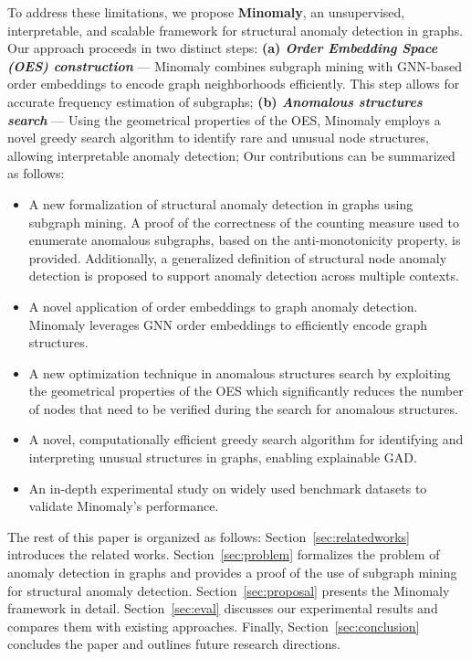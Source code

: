 \documentclass[pdflatex,sn-mathphys-num]{sn-jnl}%
\theoremstyle{thmstyleone}%
\theoremstyle{thmstyletwo}%
\theoremstyle{thmstylethree}%
\begin{document}
To address these limitations, we propose \textbf{Minomaly}, an unsupervised, interpretable, and scalable framework for structural anomaly detection in graphs. Our approach proceeds in two distinct steps: \textbf{(a) \textit{Order Embedding Space (OES) construction}}  --- Minomaly combines subgraph mining with GNN-based order embeddings to encode graph neighborhoods efficiently. This step allows for accurate frequency estimation of subgraphs; \textbf{(b) \textit{Anomalous structures search}}  --- Using the geometrical properties of the OES, Minomaly employs a novel greedy search algorithm to identify rare and unusual node structures, allowing interpretable anomaly detection;
Our contributions can be summarized as follows:
\begin{itemize}
    \item A new formalization of structural anomaly detection in graphs using subgraph mining. A proof of the correctness of the counting measure used to enumerate anomalous subgraphs, based on the anti-monotonicity property, is provided. Additionally, a generalized definition of structural node anomaly detection is proposed to support anomaly detection across multiple contexts.
    \item A novel application of order embeddings to graph anomaly detection. Minomaly leverages GNN order embeddings to efficiently encode graph structures.
    \item A new optimization technique in anomalous structures search by exploiting the geometrical properties of the OES which significantly reduces the number of nodes that need to be verified during the search for anomalous structures.
    \item A novel, computationally efficient greedy search algorithm for identifying and interpreting unusual structures in graphs, enabling explainable GAD.
    \item An in-depth experimental study on widely used benchmark datasets to validate Minomaly's performance. 
\end{itemize}

The rest of this paper is organized as follows:  
{Section~\ref{sec:relatedworks}} introduces the  related works. {Section~\ref{sec:problem}} formalizes the problem of anomaly detection in graphs and provides a proof of the use of subgraph mining for structural anomaly detection.  
{Section~\ref{sec:proposal}} presents the Minomaly framework in detail.  
{Section~\ref{sec:eval}} discusses our experimental results and compares them with existing approaches. Finally, {Section~\ref{sec:conclusion}} concludes the paper and outlines future research directions.
\end{document}
